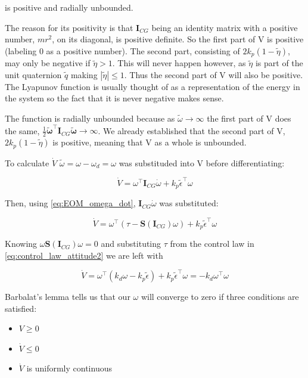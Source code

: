 is positive and radially unbounded. 

The reason for its positivity is that $\mathbf{I}_{CG}$ being an identity matrix with a positive number, $mr^2$, on its diagonal, is positive definite. So the first part of V is positive (labeling 0 as a positive number). The second part, consisting of $2 k_p (1-\tilde{\eta})$, may only be negative if $\tilde{\eta} > 1$. This will never happen however, as $\tilde{\eta}$ is part of the unit quaternion $\tilde{q}$ making $|\tilde{\eta}| \leq 1$. Thus the second part of V will also be positive. The Lyapunov function is usually thought of as a representation of the energy in the system so the fact that it is never negative makes sense. 

The function is radially unbounded because as $\tilde{\omega}\rightarrow \infty$ the first part of V does the same, $\frac{1}{2} \tilde{\boldsymbol{\omega}}^{\top} \mathbf{I}_{CG}\tilde{\boldsymbol{\omega}} \rightarrow \infty$. We already established that the second part of V, $2 k_p (1-\tilde{\eta})$ is positive, meaning that V as a whole is unbounded.

To calculate $\dot{V}$ $\tilde{\omega} = \omega - \omega_d = \omega$ was substituded into V before differentiating:

\begin{equation}
    \dot{V} = \omega^\top\mathbf{I}_{CG}\dot{\omega} + k_p\tilde{\epsilon}^\top\omega 
\end{equation}

Then, using \eqref{eq:EOM_omega_dot}, $\mathbf{I}_{CG}\dot{\omega}$ was substituted:

\begin{equation}
    \dot{V} = \omega^\top(\tau - \mathbf{S}(\mathbf{I}_{CG})\omega) + k_p\tilde{\epsilon}^\top\omega 
\end{equation}

Knowing $\omega\mathbf{S}(\mathbf{I}_{CG})\omega = 0$ and substituting $\tau$ from the control law in \eqref{eq:control_law_attitude2} we are left with

\begin{equation}
    \dot{V} = \omega^\top( k_d \omega - k_p\tilde{\epsilon}) + k_p\tilde{\epsilon}^\top\omega = -k_d\omega^\top\omega
\end{equation}

Barbalat's lemma tells us that our $\omega$ will converge to zero if three conditions are satisfied: 

\begin{itemize}
    \item $V \geq 0$
    \item $\dot{V} \leq 0$
    \item $\dot{V}$ is uniformly continuous
\end{itemize}

